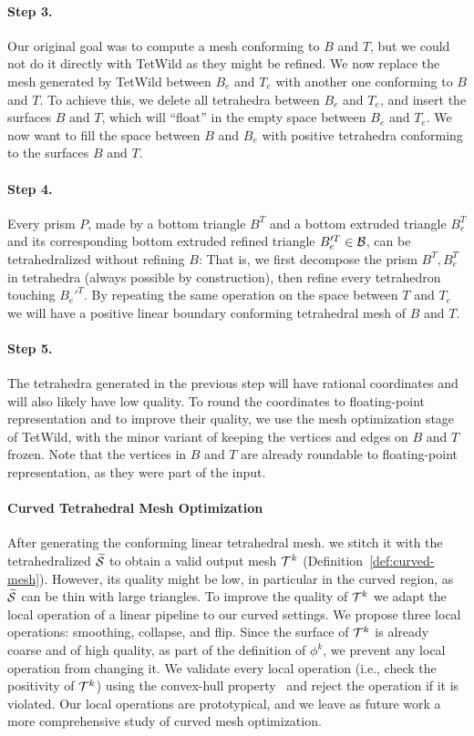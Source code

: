 \paragraph{Step 3.}
Our original goal was to compute a mesh conforming to $B$ and $T$, but we could not do it directly with TetWild as they might be refined. We now replace the mesh generated by TetWild between $B_e$ and $T_e$ with another one conforming to $B$ and $T$. To achieve this, we delete all tetrahedra between $B_e$ and $T_e$, and insert the surfaces $B$ and $T$, which will ``float'' in the empty space between $B_e$ and $T_e$. We now want to fill the space between $B$ and $B_e$ with positive tetrahedra conforming to the surfaces $B$ and $T$. 

\paragraph{Step 4.}
Every prism $P$, made by a bottom triangle $B^T$ and a bottom extruded triangle $B_e^T$ and its corresponding bottom extruded refined triangle $B_e'^T \in \mathcal{B}$, can be tetrahedralized without refining $B$: That is, we first decompose the prism $B^T, B_e^T$ in tetrahedra (always possible by construction), then refine every tetrahedron touching $B_e'^T$. By repeating the same operation on the space between $T$ and $T_e$ we will have a positive linear boundary conforming tetrahedral mesh of $B$ and $T$. 

\paragraph{Step 5.}
The tetrahedra generated in the previous step will have rational coordinates and will also likely have low quality. To round the coordinates to floating-point representation and to improve their quality, we use the mesh optimization stage of TetWild, with the minor variant of keeping the vertices and edges on $B$ and $T$ frozen. Note that the vertices in $B$ and $T$ are already roundable to floating-point representation, as they were part of the input.


\paragraph{Curved Tetrahedral Mesh Optimization}
After generating the conforming linear tetrahedral mesh. we stitch it with the tetrahedralized $\widetilde{\mathcal{S}}$ to obtain a valid output mesh $\mathcal{T}^k$ {(Definition~\ref{def:curved-mesh}).} However, its quality might be low, in particular in the curved region, as $\widetilde{\mathcal{S}}$ can be thin with large triangles. To improve the quality of  $\mathcal{T}^k$ we adapt the local operation of a linear pipeline to our curved settings. We propose three local operations: smoothing, collapse, and flip. 
Since the surface of $\mathcal{T}^k$ is already coarse {and} of high quality, {as} part of the definition of $\phi^k$, we prevent any local operation from changing it. We validate every local operation (i.e., check the positivity of $\mathcal{T}^k$) using the convex-hull property~\cite{johnen2013geometrical} and reject the operation if it is violated.
Our local operations are prototypical, and we leave as future work a more comprehensive study of curved mesh optimization.
 
